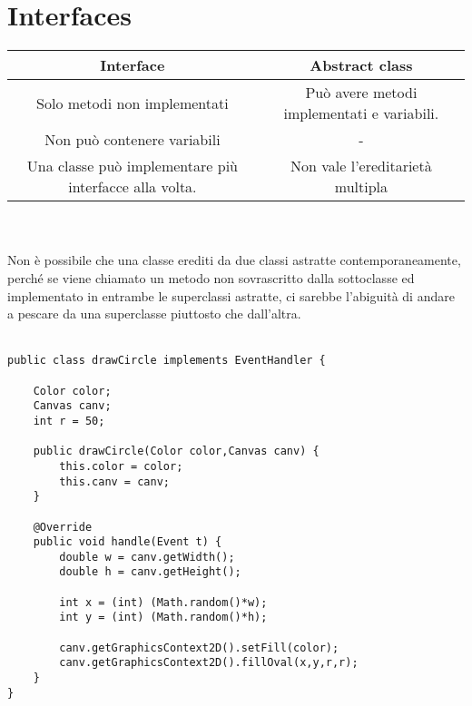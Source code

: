 \documentclass[10pt,a4paper]{article}
\begin{document}
\section{Interfaces}
\begin{tabular}{|c|c|}
\hline 
Interface & Abstract class \\ 
\hline 
Solo metodi non implementati & Può avere metodi implementati e variabili.\\
Non può contenere variabili & -\\
Una classe può implementare più interfacce alla volta. & Non vale l'ereditarietà multipla\\
\hline 
\end{tabular} 
\\\\
Non è possibile che una classe erediti da due classi astratte contemporaneamente, perché se viene chiamato un metodo non sovrascritto dalla sottoclasse ed implementato in entrambe le superclassi astratte, ci sarebbe l'abiguità di andare a pescare da una superclasse piuttosto che dall'altra.
\\\\
\begin{verbatim}
public class drawCircle implements EventHandler {

    Color color;
    Canvas canv;
    int r = 50;
    
    public drawCircle(Color color,Canvas canv) {
        this.color = color;
        this.canv = canv;
    }
    
    @Override
    public void handle(Event t) {
        double w = canv.getWidth();
        double h = canv.getHeight();
        
        int x = (int) (Math.random()*w);
        int y = (int) (Math.random()*h);
        
        canv.getGraphicsContext2D().setFill(color);
        canv.getGraphicsContext2D().fillOval(x,y,r,r);
    }
} 

\end{verbatim}
\newpage
\end{document}
